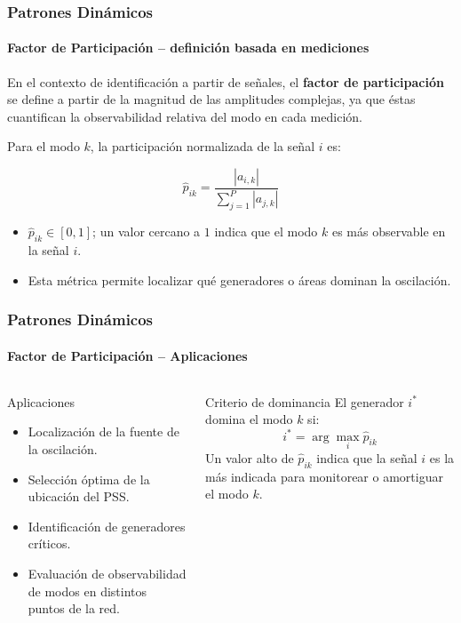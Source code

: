 \documentclass{beamer}
\begin{document}
\begin{frame}
\frametitle{Patrones Dinámicos}
\framesubtitle{Factor de Participación – definición basada en mediciones}

En el contexto de identificación a partir de señales, el \textbf{factor de participación}
se define a partir de la magnitud de las amplitudes complejas,
ya que éstas cuantifican la observabilidad relativa del modo en cada medición.

Para el modo $k$, la participación normalizada de la señal $i$ es:

\begin{equation}
    \boxed{\hat{p}_{ik} = \frac{|a_{i,k}|}{\displaystyle\sum_{j=1}^{P} |a_{j,k}|}}
    \label{eq:pf_mediciones}
\end{equation}

\begin{itemize}
    \item $\hat{p}_{ik} \in [0,1]$; un valor cercano a $1$ indica que el modo $k$
          es más observable en la señal $i$.
    \item Esta métrica permite localizar qué generadores o áreas dominan la oscilación.

\end{itemize}

\end{frame}


\begin{frame}
\frametitle{Patrones Dinámicos}
\framesubtitle{Factor de Participación – Aplicaciones}

\begin{columns}
\begin{block}{Aplicaciones}
\begin{itemize}
    \item Localización de la fuente de la oscilación.
    \item Selección óptima de la ubicación del PSS.
    \item Identificación de generadores críticos.
    \item Evaluación de observabilidad de modos en distintos puntos de la red.
\end{itemize}
\end{block}

\begin{exampleblock}{Criterio de dominancia}
    El generador $i^*$ domina el modo $k$ si:
    \begin{equation}
        i^* = \arg\max_i \hat{p}_{ik}
        \label{eq:dominancia_art}
    \end{equation}
    \vspace{0.2em}
    Un valor alto de $\hat{p}_{ik}$ indica que la señal $i$ es la más indicada
    para monitorear o amortiguar el modo $k$.
\end{exampleblock}
\end{columns}

\end{frame}
\end{document}
